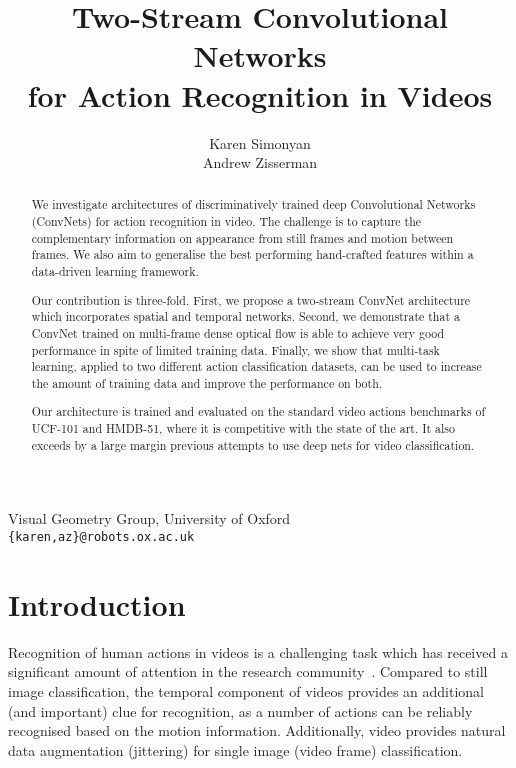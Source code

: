 \documentclass{article} \usepackage{nips14submit_e,times}
\title{Two-Stream Convolutional Networks \\ for Action Recognition in Videos}
\author{
Karen Simonyan \\
\And
Andrew Zisserman
}
\begin{document}
\maketitle

\vspace{-3.5em}
\begin{center}
Visual Geometry Group, University of Oxford\\
\texttt{\{karen,az\}@robots.ox.ac.uk}  
\end{center}
\vspace{1em}

\begin{abstract}
We investigate architectures of discriminatively trained deep
Convolutional Networks (ConvNets) for action recognition in video. The
challenge is to capture the complementary information on appearance
from still frames and motion between frames. 
We also aim to generalise the best performing hand-crafted features within a data-driven learning framework.

Our contribution is three-fold. First, we propose a two-stream
ConvNet architecture which incorporates spatial and temporal networks.
Second, we demonstrate that a ConvNet trained on multi-frame dense
optical flow is able to achieve very good performance in spite of
limited training data.  Finally, we show that multi-task learning,
applied to two different action classification datasets, can be used
to increase the amount of training data and improve the
performance on both.

Our architecture is trained and evaluated on the standard video actions
benchmarks of UCF-101 and HMDB-51, where it is competitive with the state of the art.
It also exceeds by a large margin previous attempts to use deep nets for video classification.
\end{abstract}


\section{Introduction}
\label{sec:intro}
Recognition of human actions in videos is a challenging task which has
received a significant amount of attention in the research
community~\cite{Laptev08,Jhuang07,Wang13b,Karpathy14}.  Compared to
still image classification, 
the temporal component of videos
provides an additional (and important) clue for recognition, as a
number of actions can be reliably recognised based on the motion
information. Additionally, video provides natural data augmentation
(jittering) for single image (video frame) classification.
\end{document}
